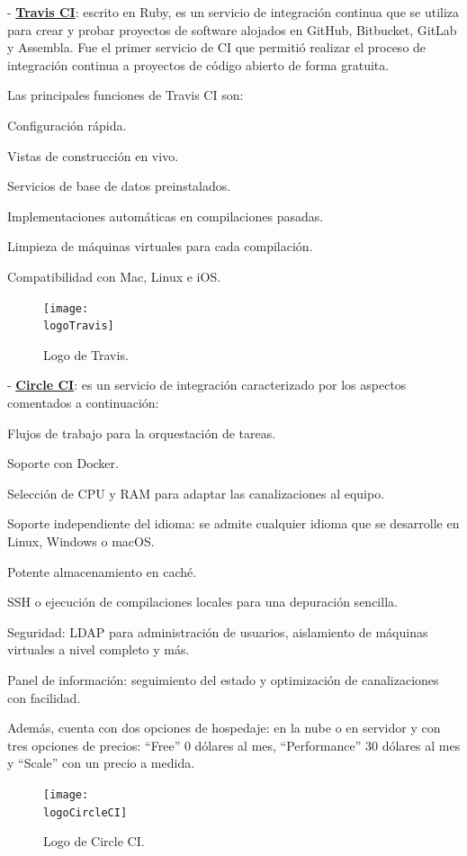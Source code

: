 - \textbf{\underline{Travis CI}}: escrito en Ruby, es un servicio de integración continua que se utiliza para crear y probar proyectos de software alojados en GitHub, Bitbucket, GitLab y Assembla. Fue el primer servicio de CI que permitió realizar el proceso de integración continua a proyectos de código abierto de forma gratuita.

Las principales funciones de Travis CI son:
\begin{compactitem}
    \item Configuración rápida.
    \item Vistas de construcción en vivo.
    \item Servicios de base de datos preinstalados.
    \item Implementaciones automáticas en compilaciones pasadas.
    \item Limpieza de máquinas virtuales para cada compilación.
    \item Compatibilidad con Mac, Linux e iOS.
\end{compactitem}

\begin{figure}[h]
    \centering
    \texttt{[image: \\logoTravis]}
    \caption{Logo de Travis.}
\end{figure}

- \textbf{\underline{Circle CI}}: es un servicio de integración caracterizado por los aspectos comentados a continuación:
\begin{compactitem}
    \item Flujos de trabajo para la orquestación de tareas.
    \item Soporte con Docker.
    \item Selección de CPU y RAM para adaptar las canalizaciones al equipo.
    \item Soporte independiente del idioma: se admite cualquier idioma que se desarrolle en Linux, Windows o macOS.
    \item Potente almacenamiento en caché.
    \item SSH o ejecución de compilaciones locales para una depuración sencilla.
    \item Seguridad: LDAP para administración de usuarios, aislamiento de máquinas virtuales a nivel completo y más.
    \item Panel de información: seguimiento del estado y optimización de canalizaciones con facilidad.
\end{compactitem}
Además, cuenta con dos opciones de hospedaje: en la nube o en servidor y con tres opciones de precios: ``Free'' 0 dólares al mes, ``Performance'' 30 dólares al mes y ``Scale'' con un precio a medida.
\begin{figure}[h]
    \centering
    \texttt{[image: \\logoCircleCI]}
    \caption{Logo de Circle CI.}
\end{figure}

